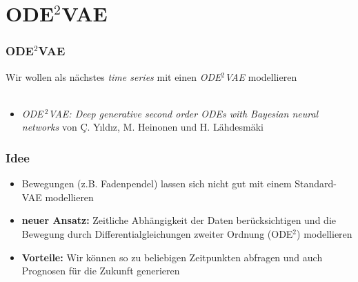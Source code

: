 

\author[Niklas Brunn]{Nix}


\beamertemplatenavigationsymbolsempty{}




\section{ODE$^{2}$VAE}

\begin{frame}
    \frametitle{ODE$^{2}$VAE}
    Wir wollen als nächstes \emph{time series} mit einen \emph{ODE$^{2}$VAE} modellieren\\ 
    \text{ }\\
    \text{ }
    \begin{itemize}
    	\item[ ] \emph{ODE$^{\ 2}$VAE: Deep generative second order ODEs with Bayesian neural networks} von Ç. Yıldız, M. Heinonen und H. Lähdesmäki
    \end{itemize}	
\end{frame}




\begin{frame}
	\frametitle{Idee}
	\begin{itemize}
	\item Bewegungen (z.B. Fadenpendel) lassen sich nicht gut mit einem Standard-VAE modellieren\\
	\item \textbf{neuer Ansatz:} Zeitliche Abhängigkeit der Daten berücksichtigen und die Bewegung durch Differentialgleichungen zweiter Ordnung (ODE$^{2}$) modellieren 
	\item \textbf{Vorteile:} Wir können so zu beliebigen Zeitpunkten abfragen und auch Prognosen für die Zukunft generieren
	\end{itemize}
\end{frame}



